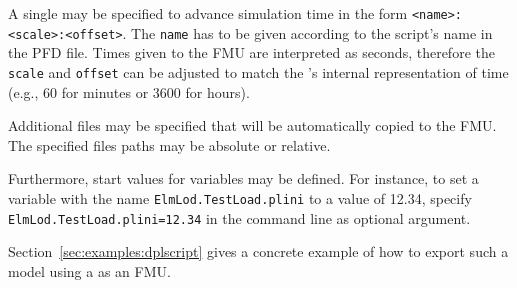 A single \dplscript may be specified to advance simulation time in the form \texttt{<name>:<scale>:<offset>}.
The \texttt{name} has to be given according to the script's name in the PFD file.
Times given to the FMU are interpreted as seconds, therefore the \texttt{scale} and \texttt{offset} can be adjusted to match the \dplscript's internal representation of time (e.g., 60 for minutes or 3600 for hours).

Additional files may be specified that will be automatically copied to the FMU. The specified files paths may be absolute or relative.

Furthermore, start values for variables may be defined. For instance, to set a variable with the name \texttt{ElmLod.TestLoad.plini} to a value of 12.34, specify \texttt{ElmLod.TestLoad.plini=12.34} in the command line as optional argument.

Section~\ref{sec:examples:dplscript} gives a concrete example of how to export such a model using a \dplscript as an FMU.
